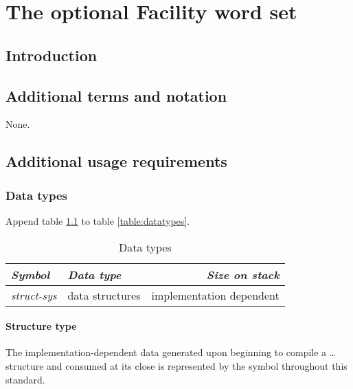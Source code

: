 
\chapter{The optional Facility word set} %

\section{Introduction} %

\section{Additional terms and notation} %
None.

\section{Additional usage requirements} %


\subsection{Data types} %

Append table \ref{facility:types} to table \ref{table:datatypes}.

\begin{table}[h]
  \begin{center}
	\caption{Data types}
	\label{facility:types}
	\begin{tabular}{llr}
	\hline\hline
	\emph{Symbol} & \emph{Data type} & \emph{Size on stack} \\
	\hline
	\emph{struct-sys}
	& data structures
	& implementation dependent \\
	\hline\hline
	\end{tabular}
  \end{center}
\end{table}

\subsubsection{Structure type} %

The implementation-dependent data generated upon beginning to compile
a  {\ldots}  structure and
consumed at its close is represented by the symbol 
throughout this standard.

